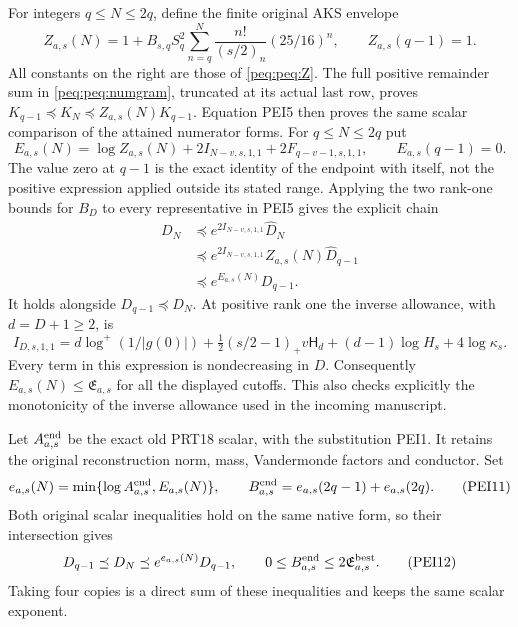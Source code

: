 \documentclass[11pt,a4paper]{article}
\begin{document}
For integers $q\le N\le2q$, define the finite original AKS envelope
\[
 Z_{a,s}(N)=1+B_{s,q}S_q^2
             \sum_{n=q}^{N}\frac{n!}{(s/2)_n}(25/16)^n,
 \qquad Z_{a,s}(q-1)=1.                                         \tag{PEI7}
\]
All constants on the right are those of \eqref{peq:peq:Z}. The full
positive remainder sum in \eqref{peq:peq:numgram}, truncated at its actual
last row, proves
$K_{q-1}\preceq K_N\preceq Z_{a,s}(N)K_{q-1}$.
Equation PEI5 then proves the same scalar comparison of the attained
numerator forms. For $q\le N\le2q$ put
\[
 E_{a,s}(N)=\log Z_{a,s}(N)
           +2I_{N-v,s,1,1}+2F_{q-v-1,s,1,1},
 \qquad E_{a,s}(q-1)=0.                                        \tag{PEI8}
\]
The value zero at $q-1$ is the exact identity of the endpoint with
itself, not the positive expression applied outside its stated range.
Applying the two rank-one bounds for $B_D$ to every representative
in PEI5 gives the explicit chain
\[
 \begin{split}
 D_N&\preceq e^{2I_{N-v,s,1,1}}\widehat D_N\\
    &\preceq e^{2I_{N-v,s,1,1}}Z_{a,s}(N)\widehat D_{q-1}\\
    &\preceq e^{E_{a,s}(N)}D_{q-1}.
 \end{split}                                                     \tag{PEI9}
\]
It holds alongside $D_{q-1}\preceq D_N$.
At positive rank one the inverse allowance, with $d=D+1\ge2$, is
\[
 I_{D,s,1,1}
 =d\log^+(1/|g(0)|)
  +\tfrac12(s/2-1)_+v\mathsf H_d
  +(d-1)\log H_s+4\log\kappa_s.
                                                               \tag{PEI10}
\]
Every term in this expression is nondecreasing in $D$.
Consequently $E_{a,s}(N)\le\mathfrak E_{a,s}$ for all the displayed
cutoffs. This also checks explicitly the monotonicity of the inverse
allowance used in the incoming manuscript.

Let $A^{\rm end}_{a,s}$ be the exact old PRT18 scalar, with the
substitution PEI1. It retains the original reconstruction norm, mass,
Vandermonde factors and conductor. Set
\[
 e_{a,s}(N)=\min\{\log A^{\rm end}_{a,s},E_{a,s}(N)\},\qquad
 B^{\rm end}_{a,s}=e_{a,s}(2q-1)+e_{a,s}(2q).
                                                               \tag{PEI11}
\]
Both original scalar inequalities hold on the same native form, so
their intersection gives
\[
 D_{q-1}\preceq D_N\preceq e^{e_{a,s}(N)}D_{q-1},
 \qquad
 0\le B^{\rm end}_{a,s}\le2\mathfrak E^{\rm best}_{a,s}.
                                                               \tag{PEI12}
\]
Taking four copies is a direct sum of these inequalities and keeps
the same scalar exponent.
\end{document}
